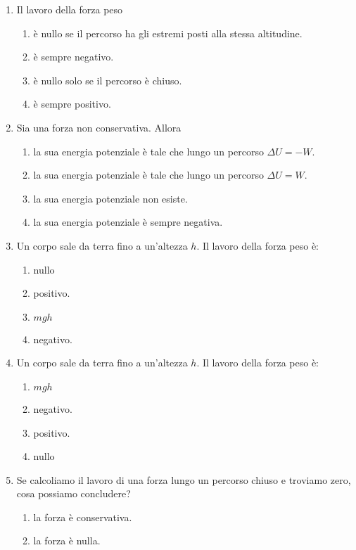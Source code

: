 \documentclass{article}
\begin{document}
\begin{enumerate}
\begin{enumerate}[label=\Alph*.]
  \end{enumerate}
  \item Il lavoro della forza peso
  \begin{enumerate}[label=\Alph*.]
    \item è nullo se il percorso ha gli estremi posti alla stessa altitudine.
    \item è sempre negativo.
    \item è nullo solo se il percorso è chiuso.
    \item è sempre positivo.
  \end{enumerate}
  \item Sia  una forza non conservativa. Allora
  \begin{enumerate}[label=\Alph*.]
    \item la sua energia potenziale è tale che lungo un percorso $\Delta U=-W$.
    \item la sua energia potenziale è tale che lungo un percorso $\Delta U=W$.
    \item la sua energia potenziale non esiste.
    \item la sua energia potenziale è sempre negativa.
  \end{enumerate}
  \item Un corpo sale da terra fino a un'altezza $h$. Il lavoro della forza peso è:
  \begin{enumerate}[label=\Alph*.]
    \item nullo
    \item positivo.
    \item $mgh$
    \item negativo.
  \end{enumerate}
  \item Un corpo sale da terra fino a un'altezza $h$. Il lavoro della forza peso è:
  \begin{enumerate}[label=\Alph*.]
    \item $mgh$
    \item negativo.
    \item positivo.
    \item nullo
  \end{enumerate}
  \item Se calcoliamo il lavoro di una forza lungo un percorso chiuso e troviamo zero, cosa possiamo concludere?
  \begin{enumerate}[label=\Alph*.]
    \item la forza è conservativa.
    \item la forza è nulla.

\end{enumerate}
\end{enumerate}
\end{document}
